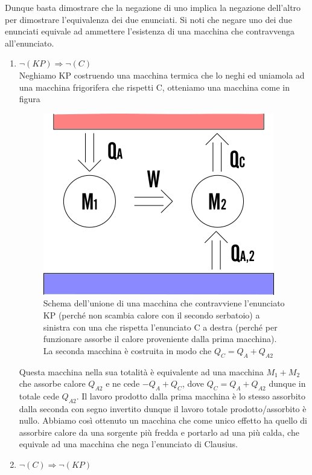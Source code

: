\documentclass[10pt,a4paper]{article}
\begin{document}
Dunque basta dimostrare che la negazione di uno implica la negazione dell'altro per dimostrare l'equivalenza dei due enunciati. Si noti che negare uno dei due enunciati equivale ad ammettere l'esistenza di una macchina che contravvenga all'enunciato. 
\begin{enumerate}
	\item \(\neg(KP)\Rightarrow \neg(C)\)\\
	
	Neghiamo KP costruendo una macchina termica che lo neghi ed uniamola ad una macchina frigorifera che rispetti C, otteniamo una macchina come in figura
\begin{figure}[h!]
	\centering
	\includegraphics[width=0.5\linewidth]{../images/KP-C}
	\caption{Schema dell'unione di una macchina che contravviene l'enunciato KP (perché non scambia calore con il secondo serbatoio) a sinistra con una che rispetta l'enunciato C a destra (perché per funzionare assorbe il calore proveniente dalla prima macchina). La seconda macchina è costruita in modo che \(Q_C = Q_A + Q_{A2}\)}
	\label{fig:kp-c}
\end{figure}
\FloatBarrier
Questa macchina nella sua totalità è equivalente ad una macchina \(M_1 + M_2\) che assorbe calore \(Q_{A2}\) e ne cede \(-Q_A+Q_C\), dove $Q_C = Q_{A}+Q_{A2}$ dunque in totale cede \(Q_{A2}\). Il lavoro prodotto dalla prima macchina è lo stesso assorbito dalla seconda con segno invertito dunque il lavoro totale prodotto/assorbito è nullo. Abbiamo così ottenuto un macchina che come unico effetto ha quello di assorbire calore da una sorgente più fredda e portarlo ad una più calda, che equivale ad una macchina che nega l'enunciato di Clausius.

\item \(\neg(C)\Rightarrow \neg(KP)\)\\


\end{enumerate}
\end{document}

